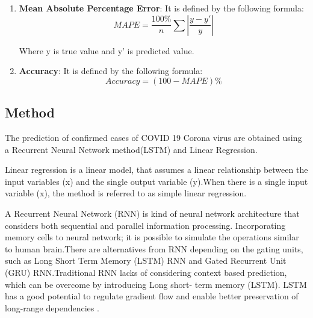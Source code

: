 \begin{enumerate}
	\item \textbf{Mean Absolute Percentage Error}: It is defined by
		the following formula:
		\begin{equation}\label{eqn1}
			MAPE = \frac{100\%}{n} \sum \left \vert \frac{y-y\prime}{y}
			\right \vert
		\end{equation}

		Where y is true value and y' is predicted value.

	\item \textbf{Accuracy}: It is defined by the following formula:
		\begin{equation}\label{eqn2}
			Accuracy = (100 - MAPE)\%
		\end{equation}

\end{enumerate}


\subsection{Method}

The prediction of confirmed cases of COVID 19 Corona virus are obtained
using a Recurrent Neural Network method(LSTM) and Linear Regression.

Linear regression is a linear model, that assumes a linear relationship between the input variables
(x) and the single output variable (y).When there is a single input variable (x), the method
is referred to as simple linear regression.

A Recurrent Neural Network (RNN) is kind of neural network architecture that considers
both sequential and parallel information processing. Incorporating memory cells to neural
network; it is possible to simulate the operations similar to human brain.There are
alternatives from RNN depending on the gating units, such as Long Short Term Memory
(LSTM) RNN and Gated Recurrent Unit (GRU) RNN.Traditional RNN lacks of
considering context based prediction, which can be overcome by introducing Long short-
term memory (LSTM). LSTM has a good potential to regulate gradient flow and enable
better preservation of long-range dependencies \cite{bandyopadhyay2020machine}.


